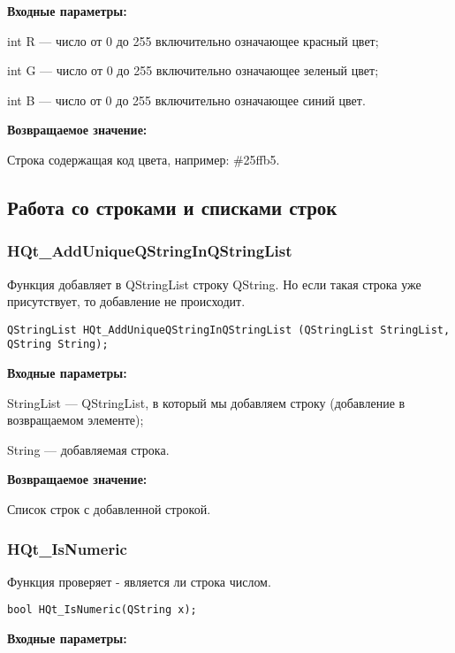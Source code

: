 \documentclass[a4paper,12pt]{article}
\begin{document}
\textbf{Входные параметры:}

int R --- число от 0 до 255 включительно означающее красный цвет;
 
    int G --- число от 0 до 255 включительно означающее зеленый цвет;
 
    int B --- число от 0 до 255 включительно означающее синий цвет.

\textbf{Возвращаемое значение:}

Строка содержащая код цвета, например: \#25ffb5.


\subsection{Работа со строками и списками строк}

\subsubsection{HQt\_AddUniqueQStringInQStringList}\label{HQt_AddUniqueQStringInQStringList}

Функция добавляет в QStringList строку QString. Но если такая строка уже присутствует, то добавление не происходит.


\begin{lstlisting}[label=code_syntax_HQt_AddUniqueQStringInQStringList,caption=Синтаксис]
QStringList HQt_AddUniqueQStringInQStringList (QStringList StringList, QString String);
\end{lstlisting}

\textbf{Входные параметры:}
 
StringList --- QStringList, в который мы добавляем строку (добавление в возвращаемом элементе);

     String --- добавляемая строка.

\textbf{Возвращаемое значение:}

Список строк с добавленной строкой.


\subsubsection{HQt\_IsNumeric}\label{HQt_IsNumeric}

Функция проверяет - является ли строка числом.


\begin{lstlisting}[label=code_syntax_HQt_IsNumeric,caption=Синтаксис]
bool HQt_IsNumeric(QString x);
\end{lstlisting}

\textbf{Входные параметры:}
\end{document}
